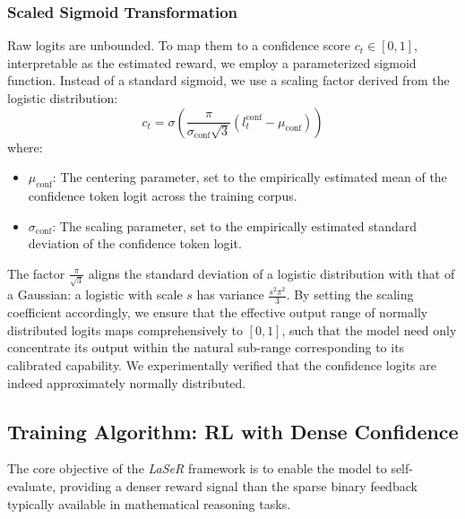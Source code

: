 \documentclass[a4paper,oneside,10pt,ngerman,english]{scrartcl}
\begin{document}
\subsubsection{Scaled Sigmoid Transformation}
Raw logits are unbounded. To map them to a confidence score $c_t \in [0, 1]$, interpretable as the estimated reward, we employ a parameterized sigmoid function. Instead of a standard sigmoid, we use a scaling factor derived from the logistic distribution:
\begin{equation}
	\label{eq:sigmoid_transform}
	c_t = \sigma\!\left( \frac{\pi}{\sigma_{\mathrm{conf}}\sqrt{3}} \left(l_{t}^{\mathrm{conf}} - \mu_{\mathrm{conf}}\right) \right)
\end{equation}
where:
\begin{itemize}
	\item $\mu_{\mathrm{conf}}$: The centering parameter, set to the empirically estimated mean of the confidence token logit across the training corpus.
	\item $\sigma_{\mathrm{conf}}$: The scaling parameter, set to the empirically estimated standard deviation of the confidence token logit.
\end{itemize}
The factor $\frac{\pi}{\sqrt{3}}$ aligns the standard deviation of a logistic distribution with that of a Gaussian: a logistic with scale $s$ has variance $\frac{s^2 \pi^2}{3}$. By setting the scaling coefficient accordingly, we ensure that the effective output range of normally distributed logits maps comprehensively to $[0, 1]$, such that the model need only concentrate its output within the natural sub-range corresponding to its calibrated capability. We experimentally verified that the confidence logits are indeed approximately normally distributed.

\subsection{Training Algorithm: RL with Dense Confidence}
\label{sec:training_algorithm}
The core objective of the \textit{LaSeR} framework is to enable the model to self-evaluate, providing a denser reward signal than the sparse binary feedback typically available in mathematical reasoning tasks.
\end{document}
